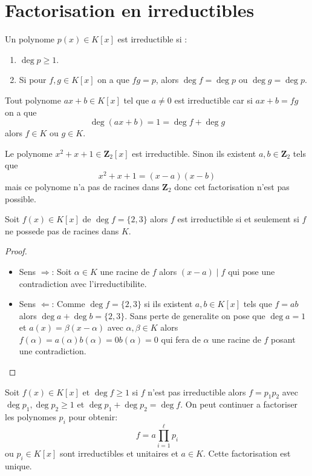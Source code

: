 \section{Factorisation en irreductibles}
\begin{definition}
Un polynome $p(x)\in K[x]$ est irreductible si :
\begin{enumerate}
\item $\deg p \geq 1$.
\item Si pour $f,g\in K[x]$ on a que $fg=p$, alors $\deg f = \deg p$ ou $\deg g =\deg p$.
\end{enumerate}
\end{definition}
\begin{example}
Tout polynome $ax+b\in K[x]$ tel que $a\neq 0$ est irreductible car si $ax+b=fg$ on a que
$$
\deg (ax+b)=1=\deg f+\deg g
$$
alors $f\in K$ ou $g\in K$.
\end{example}
\begin{example}
Le polynome $x^{2}+x+1\in \mathbf{Z}_{2}[x]$ est irreductible. Sinon ils existent $a,b\in \mathbf{Z}_{2}$ tels que
$$
x^{2}+x+1=(x-a)(x-b)
$$
mais ce polynome n'a pas de racines dans $\mathbf{Z}_{2}$ donc cet factorisation n'est pas possible.
\end{example}
\begin{theorem}
Soit $f(x)\in K[x]$ de $\deg f=\{ 2,3 \}$ alors $f$ est irreductible si et seulement si $f$ ne possede pas de racines dans $K$. 
\end{theorem}
\begin{proof}
\begin{itemize}
\item Sens $\Rightarrow$: Soit $\alpha \in K$ une racine de $f$ alors $(x-a)\mid f$ qui pose une contradiction avec l'irreductibilite.
\item Sens $\Leftarrow$: Comme $\deg f=\{ 2,3 \}$ si ils existent $a,b\in K[x]$ tels que $f=ab$ alors $\deg a+\deg b=\{ 2,3 \}$. Sans perte de generalite on pose que $\deg a=1$ et $a(x)=\beta(x-\alpha)$ avec $\alpha,\beta \in K$ alors $f(\alpha)=a(\alpha)b(\alpha)=0b(\alpha)=0$ qui fera de $\alpha$ une racine de $f$ posant une contradiction.
\end{itemize}
\end{proof}

Soit $f(x)\in K[x]$ et $\deg f \ge 1$ si $f$ n'est pas irreductible alors $f=p_{1}p_{2}$ avec $\deg p_{1},\deg p_{2} \ge 1$ et $\deg p_{1}+\deg p_{2}=\deg f$. On peut continuer a factoriser les polynomes $p_{i}$ pour obtenir:
\begin{equation}
f=a\prod_{i=1}^{\ell} p_{i} \label{decomp}
\end{equation}
ou $p_{i}\in K[x]$ sont irreductibles et unitaires et $a\in K$. Cette factorisation est unique.

